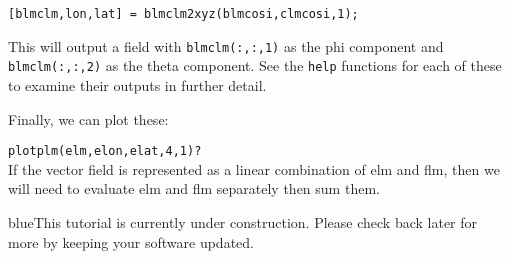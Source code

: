 \documentclass[11pt]{article}
\newcommand{\TAG}{\begin{color}{blue}This tutorial is currently under construction. Please check back later for more by keeping your software updated.\end{color}}
\begin{document}
\verb|[blmclm,lon,lat] = blmclm2xyz(blmcosi,clmcosi,1);|

This will output a field with \verb|blmclm(:,:,1)| as the phi component and \verb|blmclm(:,:,2)| as the theta component.  See the \verb|help| functions for each of these to examine their outputs in further detail.

Finally, we can plot these:

\verb|plotplm(elm,elon,elat,4,1)?|\\


If the vector field is represented as a linear combination of elm and flm, then we will need to evaluate elm and flm separately then sum them.



\TAG
\end{document}

